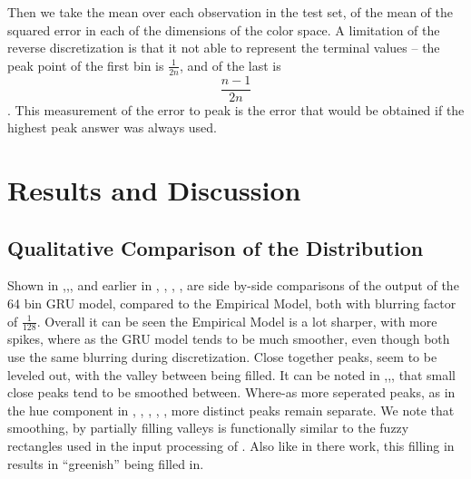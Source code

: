 \documentclass[11pt,letterpaper]{article}
\newcommand{\textcite}{\newcite}
\begin{document}
Then we take the mean over each observation in the test set, of the mean of the squared error in each of the dimensions of the color space.
A limitation of the reverse discretization is that it not able to represent the terminal values -- the peak point of the first bin is $\frac{1}{2n}$, and of the last is $$\frac{n-1}{2n}$$.
This measurement of the error to peak is the error that would be obtained if the highest peak answer was always used.








\section{Results and Discussion}

\subsection{Qualitative Comparison of the Distribution}



Shown in ,,, and earlier in , , , ,  are side by-side comparisons of the output of the 64 bin GRU model, compared to the Empirical Model, both with blurring factor of $\frac{1}{128}$.
Overall it can be seen the Empirical Model is a lot sharper, with more spikes,
where as the GRU model tends to be much smoother, even though both use the same blurring during discretization.
Close together peaks, seem to be leveled out, with the valley between being filled.
It can be noted in ,,, that small close peaks tend to be smoothed between.
Where-as more seperated peaks, as in the hue component in , , , , , more distinct peaks remain separate.
We note that smoothing, by partially filling valleys is functionally similar to the fuzzy rectangles used in the input processing of \textcite{mcmahan2015bayesian}.
Also like in there work, this filling in results in ``greenish'' being filled in.
\end{document}
